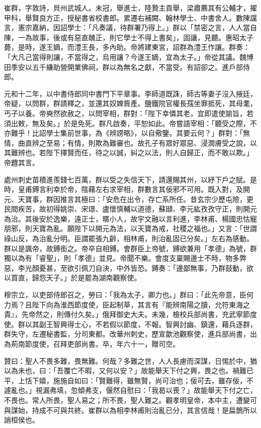 \begin{pinyinscope}
 崔群，字敦詩，貝州武城人。未冠，舉進士，陸贄主貢舉，梁肅薦其有公輔才，擢甲科，舉賢良方正，授秘書省校書郎。累遷右補闕、翰林學士、中書舍人。數陳讜言，憲宗嘉納，因詔學士：「凡奏議，待群署乃得上。」群以「禁密之言，人人當自陳，一為故事，後或有惡直醜正，則它學士不得上書矣」，固讓，見聽。惠昭太子薨，是時，遂王嫡，而澧王長，多內助。帝將建東宮，詔群為澧王作讓。群奏：「大凡己當得則讓，不當得之，烏用讓？今遂王嫡，宜為太子。」帝從其議。魏博田季安以五千縑助營開業佛祠，群以為無名之獻，不當受。有詔卻之。進戶部侍郎。



 元和十二年，以中書侍郎同中書門下平章事。李師道既誅，師古等妻子沒入掖廷，帝疑，以問群，群請釋之，並還其奴婢貲產。鹽鐵院官權長孺坐罪抵死，其母耄，丐子以養。帝奭然欲赦之，以問宰相，群對：「陛下幸憐其老，宜即遣使諭旨，若須出敕，無及矣。」於是免死。群凡啟奏，平恕如此。帝嘗語宰相：「聽受之際，不亦難乎！比詔學士集前世事，為《辨謗略》，以自儆鑒。其要云何？」群對：「無情，曲直辨之至易；有情，則欺為難審也。故孔子有眾好眾惡、浸潤膚受之說，以其難辨也。若陛下擇賢而任，待之以誠，糾之以法，則人自歸正，而不敢以欺。」帝韙其言。



 處州刺史苗積進羨錢七百萬，群以受之失信天下，請還賜其州，以紓下戶之賦。是時，皇甫鎛言利幸於帝，陰藉左右求宰相，群數言其佞邪不可用。既入對，及開元、天寶事，群因推言其極曰：「安危在出令，存亡系所任。昔玄宗少歷屯險，更民間疾苦，故初得姚崇、宋璟、盧懷慎輔以道德，蘇頲、李元紘孜孜守正，則開元為治。其後安於逸樂，遠正士，暱小人，故宇文融以言利進，李林甫、楊國忠怙寵朋邪，則天寶為亂。願陛下以開元為法，以天寶為戒，社稷之福也。」又言：「世謂祿山反，為治亂分明。臣謂罷張九齡，相林甫，則治亂固已分矣。」左右為感動。群以是諷帝，故鎛銜之。帝卒自相鎛。會群臣上帝號，鎛欲兼用「孝德」為號，群獨以為有「睿聖」，則「孝德」並見。帝聞不樂。會度支稟賜邊士不時，物多弊惡，李光顏憂甚，至欲引佩刀自決，中外皆恐。鎛奏：「邊鄙無事，乃群鼓動，欲以買直，歸怨天子。」於是罷為湖南觀察使。



 穆宗立，以吏部侍郎召之，勞曰：「我為太子，卿力也。」群曰：「此先帝意，臣何力焉？且陛下向為淮西節度使，臣起制草，其言有『能辨南陽之牘，允符東海之貴』，先帝然之，則傳付久矣。」俄拜御史大夫。未幾，檢校兵部尚書，充武寧節度使。群以其副王智興得士心，不若假以節度，不報。智興討幽、鎮還，藉兵逐群，群失守，左遷秘書監，分司東都。改華州刺史，歷宣歙池觀察使，進兵部尚書，出為荊南節度使，召拜吏部尚書。卒，年六十一，贈司空。



 贊曰：聖人不畏多難，畏無難。何哉？多難之世，人人長慮而深謀，日惕於中，猶以為未也，曰：「吾覆亡不暇，又何以安？」故能舉天下付之興，畏之也。禍難已平，上恬下嬉，施施自如曰：「賢難得，雖無賢，尚可治也；佞可去，雖存佞，不遽亂也。」視漏弗填，忽傾弗支，偃然自慰曰：「我曷以喪？」故能舉天下付之亡，不畏也。常人所畏，聖人易之；所不畏，聖人難之。觀孝明皇帝，本中主，遭變可與謀始，持成不可與共終。崔群以為相李林甫則治亂已分，其言信哉！是扁鵲所以誚桓侯也。



\end{pinyinscope}